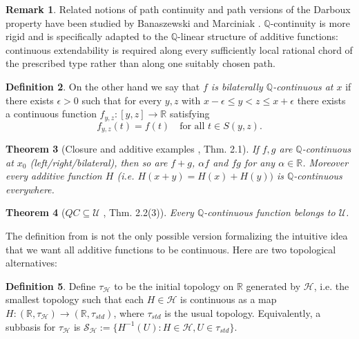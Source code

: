 \documentclass[11pt]{amsart} %
\newtheorem{theorem}{Theorem}[section]
\theoremstyle{definition}
\newtheorem{definition}[theorem]{Definition}
\newtheorem{remark}[theorem]{Remark}
\newcommand{\Q}{\mathbb{Q}}
\newcommand{\AD}{\mathcal{H}}
\begin{document}
\begin{remark}
Related notions of path continuity and path versions of the Darboux property
have been studied by Banaszewski and Marciniak
\cite{41,42,43,44}.
$\Q$-continuity is more rigid and is specifically adapted to the $\Q$-linear
structure of additive functions: continuous extendability is required along
every sufficiently local rational chord of the prescribed type rather than
along one suitably chosen path.
\end{remark} 

\begin{definition}
On the other hand we say that \emph{$f$ is bilaterally $\Q$-continuous at $x$} if
there exists $\epsilon>0$ such that for every $y, z$ with $x-\epsilon\le y<z\le x+\epsilon$ there exists
a continuous function $f_{y,z}:[y,z]\rightarrow\mathbb{R}$ satisfying
\begin{equation}
f_{y,z}(t)=f(t) \quad \text{for all } t\in S(y,z).
\end{equation}
\label{def:bilateral}
\end{definition}



\begin{theorem}[Closure and additive examples \cite{10}, Thm. 2.1]
If $f,g$ are $\mathbb{Q}$-continuous at $x_{0}$ (left/right/bilateral), then so are $f+g$, $\alpha f$ and $fg$ for any
$\alpha\in\mathbb{R}$. Moreover every additive function $H$ (i.e. $H(x+y)=H(x)+H(y))$ is
$\mathbb{Q}$-continuous everywhere.
\end{theorem}

\begin{theorem}[$QC\subseteq\mathcal{U}$ \cite{10}, Thm. 2.2(3)]
Every $\mathbb{Q}$-continuous function belongs
to $\mathcal{U}$.
\end{theorem}

The definition from \cite{10} is not the only possible version formalizing the intuitive idea that we want all additive functions to be continuous. Here are two topological alternatives:

\begin{definition}%
Define $\tau_{\AD}$ to be the initial topology on $\mathbb{R}$ generated
by $\mathcal{H}$, i.e. the smallest topology such that each $H\in\AD$ is continuous as a map
$ H:(\mathbb{R},\tau_{\AD})\rightarrow(\mathbb{R},\tau_{std})$, 
where $\tau_{std}$ is the usual topology. Equivalently, a subbasis for $\tau_{\AD}$ is
$\mathcal{S}_{\AD}:=\{H^{-1}(U):H\in\AD,U\in\tau_{std}\}$.
\end{definition}
\end{document}
